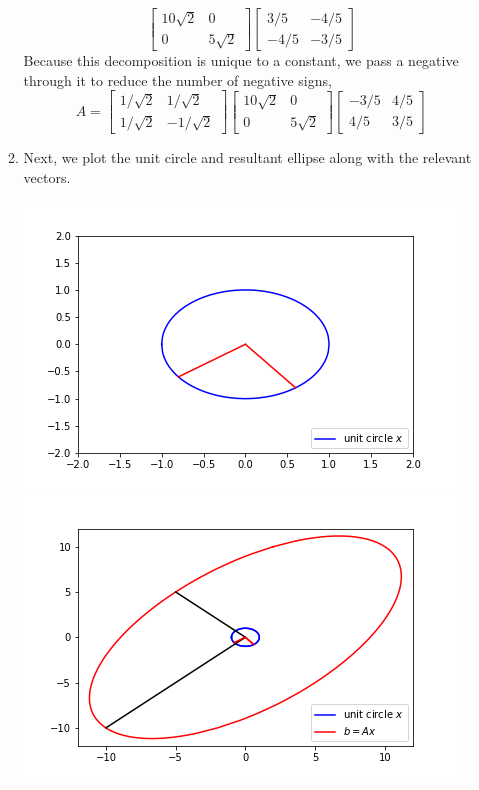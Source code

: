 \documentclass[letterpaper,10pt]{article}
\begin{document}
\begin{enumerate}
\begin{enumerate}
\[\begin{bmatrix}
10\sqrt{2} & 0\\0 & 5\sqrt{2}
\end{bmatrix}\begin{bmatrix}
3/5 & -4/5\\
-4/5 & -3/5
\end{bmatrix}\]
Because this decomposition is unique to a constant, we pass a negative through it to reduce the number of negative signs,
\[A=\begin{bmatrix}
1/\sqrt{2} & 1/\sqrt{2}\\
1/\sqrt{2} & -1/\sqrt{2}
\end{bmatrix}\begin{bmatrix}
10\sqrt{2} & 0\\0 & 5\sqrt{2}
\end{bmatrix}\begin{bmatrix}
-3/5 & 4/5\\
4/5 & 3/5
\end{bmatrix}\]
\item Next, we plot the unit circle and resultant ellipse along with the relevant vectors.
\begin{center}
\includegraphics[scale=.6]{53circ.png}
\includegraphics[scale=.6]{53elip.png}

\end{center}
\end{enumerate}
\end{enumerate}
\end{document}
